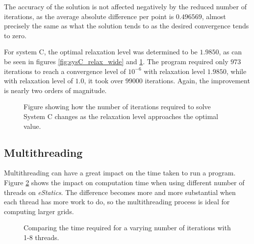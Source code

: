 The accuracy of the solution is not affected negatively by the reduced number of iterations, as the average absolute difference per point is $0.496569$, almost precisely the same as what the solution tends to as the desired convergence tends to zero.

For system C, the optimal relaxation level was determined to be $1.9850$, as can be seen in figures \ref{fig:sysC_relax_wide} and \ref{fig:sysC_relax_narrow}. The program required only $973$ iterations to reach a convergence level of $10^{-6}$ with relaxation level $1.9850$, while with relaxation level of $1.0$, it took over $99000$ iterations. Again, the improvement is nearly two orders of magnitude.

\begin{figure}[h!]
\centering
\setlength\fboxsep{0pt}
\setlength\fboxrule{0.5pt}
\label{fig:sysC_relax_narrow}
\caption{Figure showing how the number of iterations required to solve System C changes as the relaxation level approaches the optimal value.}
\end{figure}

\subsection{Multithreading}
Multithreading can have a great impact on the time taken to run a program. Figure \ref{fig:multiple_multithreads} shows the impact on computation time when using different number of threads on \emph{eStatics}. The difference becomes more and more substantial when each thread has more work to do, so the multithreading process is ideal for computing larger grids.

\begin{figure}[h!]
\centering
\setlength\fboxsep{0pt}
\setlength\fboxrule{0.5pt}
\label{fig:multiple_multithreads}
\caption{Comparing the time required for a varying number of iterations with 1-8 threads.}
\end{figure}